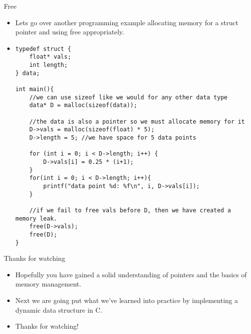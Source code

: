 \documentclass[10pt]{beamer}
\begin{document}
\begin{frame}[fragile]{Free} 
\begin{itemize}[<+->]
	\item Lets go over another programming example allocating memory for a struct pointer and using free appropriately.

	\item \begin{verbatim}
typedef struct {
    float* vals;
    int length;
} data;

int main(){
    //we can use sizeof like we would for any other data type
    data* D = malloc(sizeof(data));

    //the data is also a pointer so we must allocate memory for it
    D->vals = malloc(sizeof(float) * 5);
    D->length = 5; //we have space for 5 data points

    for (int i = 0; i < D->length; i++) {
        D->vals[i] = 0.25 * (i+1);
    }
    for(int i = 0; i < D->length; i++){
        printf("data point %d: %f\n", i, D->vals[i]);
    }

    //if we fail to free vals before D, then we have created a memory leak.
    free(D->vals);
    free(D);
}
\end{verbatim}

\end{itemize}
\end{frame}
\begin{frame}{Thanks for watching}
	\begin{itemize}[<+->]
		\item Hopefully you have gained a solid understanding of pointers and the basics of memory management.
		\item Next we are going put what we've learned into practice by implementing a dynamic data structure in C.
		\item Thanks for watching!
	\end{itemize}
\end{frame}
\end{document}
